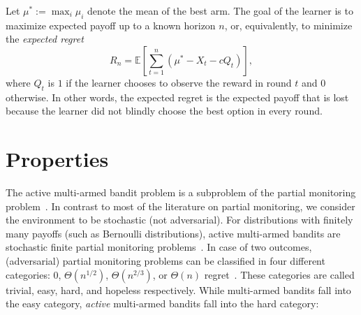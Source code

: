 \documentclass[a4paper]{article}
\DeclareMathOperator*{\argmax}{arg\,max} %
\begin{document}
Let $\mu^* := \max_i \mu_i$ denote the mean of the best arm.
The goal of the learner is to maximize expected payoff up to a known horizon $n$,
or, equivalently, to minimize the \emph{expected regret}
\[
R_n = \mathbb{E} \left[ \sum_{t=1}^n (\mu^* - X_t - c Q_t) \right],
\]
where $Q_t$ is $1$ if the learner chooses to observe the reward in round $t$ and $0$ otherwise.
In other words, the expected regret is the expected payoff
that is lost
because the learner did not blindly choose the best option in every round.




\section{Properties}

The active multi-armed bandit problem is
a subproblem of the partial monitoring problem~\citep{Piccolboni01}.
In contrast to most of the literature on partial monitoring,
we consider the environment to be stochastic (not adversarial).
For distributions with finitely many payoffs (such as Bernoulli distributions),
active multi-armed bandits are
stochastic finite partial monitoring problems~\citep{Komiyama15}.
In case of two outcomes,
(adversarial) partial monitoring problems can be classified in four different
categories: $0$, $\Theta(n^{1/2})$, $\Theta(n^{2/3})$, or $\Theta(n)$ regret~\citep{Antos13}.
These categories are called trivial, easy, hard, and hopeless respectively.
While multi-armed bandits fall into the easy category,
\emph{active} multi-armed bandits fall into the hard category:

\end{document}
